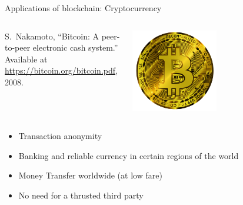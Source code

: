\documentclass{beamer}
\begin{document}
\begin{frame}{Applications of blockchain: Cryptocurrency}
\begin{columns}
\begin{column}{0.5\textwidth}
   
{\footnotesize
\begin{thebibliography}{1}
S.~Nakamoto, ``Bitcoin: A peer-to-peer electronic cash system.'' Available at
  \href{https://bitcoin.org/bitcoin.pdf}{https://bitcoin.org/bitcoin.pdf},
  2008.
\end{thebibliography}  
}
\end{column}
\begin{column}{0.5\textwidth}  %
    \begin{center}
     \includegraphics[width=0.5\textwidth]{../../Figures/bitcoin-6284869_1920.png}
     \end{center}
\end{column}
\end{columns}

\begin{itemize}
  \item Transaction anonymity
  \item Banking and reliable currency in certain regions of the world
  \item Money Transfer worldwide (at low fare)
  \item No need for a thrusted third party
\end{itemize}
\end{frame}
\end{document}
